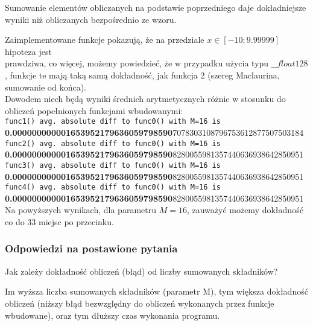 \documentclass[12pt]{article}
\newenvironment{question}[2][Pytanie]{\begin{trivlist}
\item[\hskip \labelsep {\bfseries #1}\hskip \labelsep {\bfseries #2.}]}{\end{trivlist}}
\newenvironment{hypothesis}[2][Hipoteza]{\begin{trivlist}
\item[\hskip \labelsep {\bfseries #1}\hskip \labelsep {\bfseries #2.}]}{\end{trivlist}}
\begin{document}
\begin{hypothesis}{3}
Sumowanie elementów obliczanych na podstawie poprzedniego daje dokładniejsze wyniki niż obliczanych bezpośrednio ze wzoru.
\end{hypothesis}
Zaimplementowane funkcje pokazują, że na przedziale $x \in [-10;9.99999]$ hipoteza jest \\prawdziwa, co więcej, możemy powiedzieć, że w przypadku użycia typu $\_\_float128$, funkcje te mają taką samą dokładność, jak funkcja 2 (szereg Maclaurina, sumowanie od końca).\\
Dowodem niech będą wyniki średnich arytmetycznych różnic w stosunku do obliczeń popełnionych funkcjami wbudowanymi:\\
\noindent\texttt{func1() avg. absolute diff to func0() with M=16 is}\\
\textsc{\textbf{0.000000000001653952179636059798590}7078303108796753612877507503184}\\
\texttt{func2() avg. absolute diff to func0() with M=16 is}\\
\textsc{\textbf{0.000000000001653952179636059798590}828005598135744063693864285095}1\\
\texttt{func3() avg. absolute diff to func0() with M=16 is}\\
\textsc{\textbf{0.000000000001653952179636059798590}8280055981357440636938642850951}\\
\texttt{func4() avg. absolute diff to func0() with M=16 is}\\
\textsc{\textbf{0.000000000001653952179636059798590}8280055981357440636938642850951}\\
Na powyższych wynikach, dla parametru $M = 16$, zauważyć możemy dokładność co do 33 miejsc po przecinku.

\subsubsection{Odpowiedzi na postawione pytania}
\begin{question}{1}
Jak zależy dokładność obliczeń (błąd) od liczby sumowanych składników?
\end{question}
Im wyższa liczba sumowanych składników (parametr M), tym większa dokładność obliczeń (niższy błąd bezwzględny do obliczeń wykonanych przez funkcje wbudowane), oraz tym dłuższy czas wykonania programu.
\end{document}

